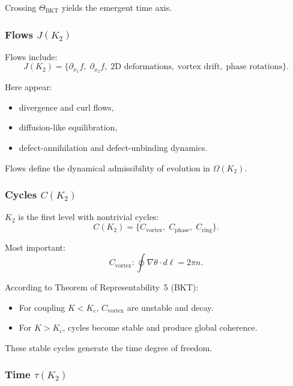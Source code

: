 Crossing $\Theta_{\mathrm{BKT}}$ yields the emergent time axis.

\subsubsection{Flows \texorpdfstring{$J(K_2)$}{J(K_2)}}

Flows include:
\[
J(K_2) = \{\partial_{x_1} f,\; \partial_{x_2} f,\;
\text{2D deformations},\; \text{vortex drift},\; \text{phase rotations}\}.
\]

Here appear:
\begin{itemize}
    \item divergence and curl flows,
    \item diffusion-like equilibration,
    \item defect-annihilation and defect-unbinding dynamics.
\end{itemize}

Flows define the dynamical admissibility of evolution in $\Omega(K_2)$.

\subsubsection{Cycles \texorpdfstring{$C(K_2)$}{C(K_2)}}

$K_2$ is the first level with nontrivial cycles:
\[
C(K_2) = \{C_{\mathrm{vortex}},\; C_{\mathrm{phase}},\; C_{\mathrm{ring}}\}.
\]

Most important:
\[
C_{\mathrm{vortex}}: \oint \nabla \theta \cdot d\ell = 2\pi n.
\]

According to Theorem of Representability~5 (BKT):
\begin{itemize}
    \item For coupling $K < K_c$, $C_{\mathrm{vortex}}$ are unstable and
          decay.
    \item For $K > K_c$, cycles become stable and produce global
          coherence.
\end{itemize}

These stable cycles generate the time degree of freedom.

\subsubsection{Time \texorpdfstring{$\tau(K_2)$}{\tau(K_2)}}

